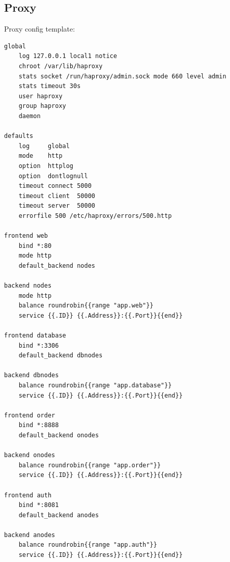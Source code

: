 \documentclass[11pt,magyar,a4paper,twoside,]{report}
\begin{document}
\subsection{Proxy}\label{proxy-1}

Proxy config template:

\begin{verbatim}
global
    log 127.0.0.1 local1 notice
    chroot /var/lib/haproxy
    stats socket /run/haproxy/admin.sock mode 660 level admin
    stats timeout 30s
    user haproxy
    group haproxy
    daemon

defaults
    log     global
    mode    http
    option  httplog
    option  dontlognull
    timeout connect 5000
    timeout client  50000
    timeout server  50000
    errorfile 500 /etc/haproxy/errors/500.http

frontend web
    bind *:80
    mode http
    default_backend nodes

backend nodes
    mode http
    balance roundrobin{{range "app.web"}}
    service {{.ID}} {{.Address}}:{{.Port}}{{end}}

frontend database
    bind *:3306
    default_backend dbnodes

backend dbnodes
    balance roundrobin{{range "app.database"}}
    service {{.ID}} {{.Address}}:{{.Port}}{{end}}

frontend order
    bind *:8888
    default_backend onodes

backend onodes
    balance roundrobin{{range "app.order"}}
    service {{.ID}} {{.Address}}:{{.Port}}{{end}}

frontend auth
    bind *:8081
    default_backend anodes

backend anodes
    balance roundrobin{{range "app.auth"}}
    service {{.ID}} {{.Address}}:{{.Port}}{{end}}
\end{verbatim}
\end{document}
